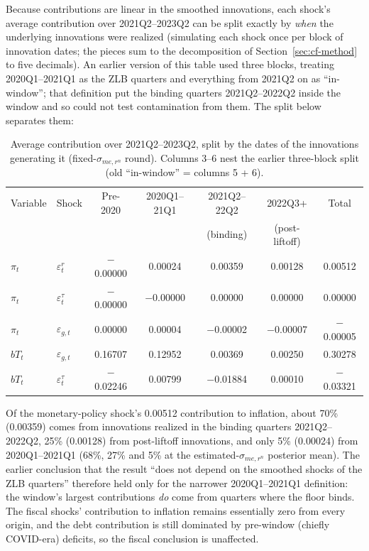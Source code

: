 \documentclass[11pt]{article}
\begin{document}
Because contributions are linear in the smoothed innovations, each
shock's average contribution over 2021Q2--2023Q2 can be split exactly by
\emph{when} the underlying innovations were realized (simulating each
shock once per block of innovation dates; the pieces sum to the
decomposition of Section~\ref{sec:cf-method} to five decimals). An
earlier version of this table used three blocks, treating 2020Q1--2021Q1
as the ZLB quarters and everything from 2021Q2 on as ``in-window''; that
definition put the binding quarters 2021Q2--2022Q2 inside the window and
so could not test contamination from them. The split below separates
them:

\begin{table}[ht]
\centering
\small
\begin{tabular}{@{}llccccc@{}}
\toprule
Variable & Shock & Pre-2020 & 2020Q1--21Q1 & 2021Q2--22Q2 & 2022Q3+ & Total \\
 & & & & (binding) & (post-liftoff) & \\
\midrule
$\pi_t$ & $\varepsilon^r_t$ & $-$0.00000 & 0.00024 & 0.00359 & 0.00128 & 0.00512 \\
$\pi_t$ & $\varepsilon^\tau_t$ & $-$0.00000 & $-$0.00000 & 0.00000 & 0.00000 & 0.00000 \\
$\pi_t$ & $\varepsilon_{g,t}$ & 0.00000 & 0.00004 & $-$0.00002 & $-$0.00007 & $-$0.00005 \\
$bT_t$ & $\varepsilon_{g,t}$ & 0.16707 & 0.12952 & 0.00369 & 0.00250 & 0.30278 \\
$bT_t$ & $\varepsilon^\tau_t$ & $-$0.02246 & 0.00799 & $-$0.01884 & 0.00010 & $-$0.03321 \\
\bottomrule
\end{tabular}
\caption{Average contribution over 2021Q2--2023Q2, split by the dates of
the innovations generating it (fixed-$\sigma_{me,r^n}$ round). Columns 3--6 nest the earlier three-block
split (old ``in-window'' = columns 5 + 6).}
\label{tab:cf-zlb}
\end{table}

Of the monetary-policy shock's 0.00512 contribution to inflation, about
70\% (0.00359) comes from innovations realized in the binding quarters
2021Q2--2022Q2, 25\% (0.00128) from post-liftoff innovations, and only 5\%
(0.00024) from 2020Q1--2021Q1 (68\%, 27\% and 5\% at the
estimated-$\sigma_{me,r^n}$ posterior mean). The earlier conclusion that the result
``does not depend on the smoothed shocks of the ZLB quarters'' therefore
held only for the narrower 2020Q1--2021Q1 definition: the window's
largest contributions \emph{do} come from quarters where the floor
binds. The fiscal shocks' contribution to inflation remains essentially
zero from every origin, and the debt contribution is still dominated by
pre-window (chiefly COVID-era) deficits, so the fiscal conclusion is
unaffected.
\end{document}
